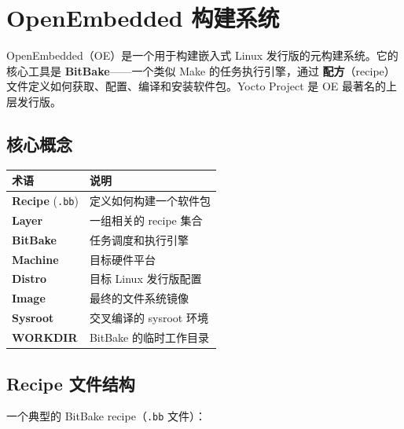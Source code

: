 \documentclass[12pt,a4paper,fontset=fandol]{ctexbook}
\newcommand{\Tp}[1]{\texttt{#1}}
\begin{document}
\chapter{OpenEmbedded 构建系统}

OpenEmbedded（OE）是一个用于构建嵌入式 Linux 发行版的元构建系统。它的核心工具是 \textbf{BitBake}——一个类似 Make 的任务执行引擎，通过 \textbf{配方}（recipe）文件定义如何获取、配置、编译和安装软件包。Yocto Project 是 OE 最著名的上层发行版。

\section{核心概念}

\begin{guideline}[title=OE 核心术语]
\begin{tabularx}{\textwidth}{lX}
\toprule
\textbf{术语} & \textbf{说明} \\
\midrule
\textbf{Recipe} (\Tp{.bb}) & 定义如何构建一个软件包 \\
\textbf{Layer} & 一组相关的 recipe 集合 \\
\textbf{BitBake} & 任务调度和执行引擎 \\
\textbf{Machine} & 目标硬件平台 \\
\textbf{Distro} & 目标 Linux 发行版配置 \\
\textbf{Image} & 最终的文件系统镜像 \\
\textbf{Sysroot} & 交叉编译的 sysroot 环境 \\
\textbf{WORKDIR} & BitBake 的临时工作目录 \\
\bottomrule
\end{tabularx}
\end{guideline}

\section{Recipe 文件结构}

一个典型的 BitBake recipe（\Tp{.bb} 文件）：
\end{document}
